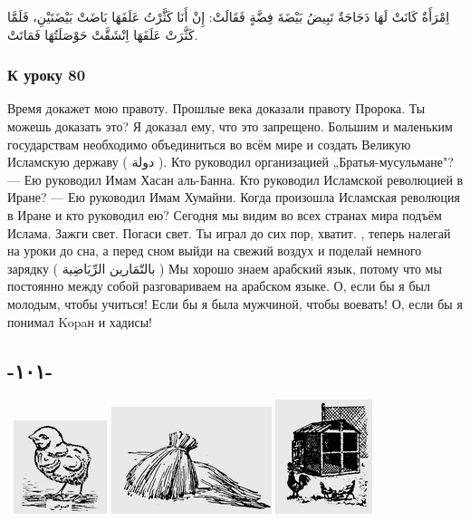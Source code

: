 \documentclass[a5paper]{article}
\newcommand\textstylePolicepardfaut[1]{#1}
\begin{document}
اِمْرَأَةٌ كَانَتْ لَهَا دَجَاجَةٌ تَبِيضُ بَيْضَةَ فِضَّةٍ فَقَالَتْ: إِنْ أَنَا كَثَّرْتُ عَلَفَهَا بَاضَتْ بَيْضَتَيْنِ، فَلَمَّا كَثَّرَتْ عَلَفَهَا اِنْشَقَّتْ حَوْصَلَتُهَا فَمَاتَتْ.

\subsubsection{К уроку 80}
Время докажет мою правоту. Прошлые века доказали правоту Пророка. Ты можешь доказать это? Я доказал ему, что это запрещено. Большим и маленьким государствам необходимо объединиться во всём мире и создать Великую Исламскую державу ( \textstylePolicepardfaut{دولة} ). Кто руководил организацией „Братья-мусульмане"? — Ею руководил Имам Хасан аль-Банна. Кто руководил Исламской революцией в Иране? — Ею руководил Имам Хумайни. Когда произошла Исламская революция в Иране и кто руководил ею? Сегодня мы видим во всех странах мира подъём Ислама. Зажги свет. Погаси свет. Ты играл до сих пор, хватит. , теперь налегай на уроки до сна, а перед сном выйди на свежий воздух и поделай немного зарядку ( \textstylePolicepardfaut{بالتّمَارين الرِّيَاضِية} ) Мы хорошо знаем арабский язык, потому что мы постоянно между собой разговариваем на арабском языке. О, если бы я был молодым, чтобы учиться! Если бы я была мужчиной, чтобы воевать! О, если бы я понимал Kopaн и хадисы!

\subsection{-١٠١-}
\  \includegraphics[width=1.0728in,height=1.0728in]{images/MuhammadBagauddinprettified-img274.png}   \includegraphics[width=1.8437in,height=1.2291in]{images/MuhammadBagauddinprettified-img275.png}   \includegraphics[width=1.1146in,height=1.3126in]{images/MuhammadBagauddinprettified-img276.png} 
\end{document}
